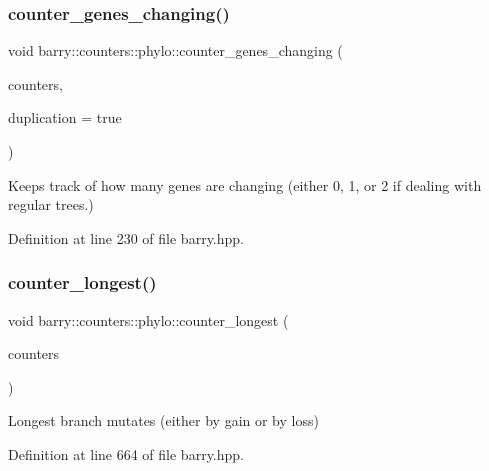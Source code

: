 \subsubsection{\texorpdfstring{counter\+\_\+genes\+\_\+changing()}{counter\_genes\_changing()}}
{\footnotesize\ttfamily void barry\+::counters\+::phylo\+::counter\+\_\+genes\+\_\+changing (\begin{DoxyParamCaption}\item[{\hyperlink{namespacebarry_1_1counters_1_1phylo_a4e401ffe66d04091343dcffaf915f8c3}{Phylo\+Counters} $\ast$}]{counters,  }\item[{bool}]{duplication = {\ttfamily true} }\end{DoxyParamCaption})\hspace{0.3cm}{\ttfamily [inline]}}



Keeps track of how many genes are changing (either 0, 1, or 2 if dealing with regular trees.) 



Definition at line 230 of file barry.\+hpp.

\mbox{\label{namespacebarry_1_1counters_1_1phylo_ae4ace7c30011a6d7047a94fd0ddf2df2}} 
\subsubsection{\texorpdfstring{counter\+\_\+longest()}{counter\_longest()}}
{\footnotesize\ttfamily void barry\+::counters\+::phylo\+::counter\+\_\+longest (\begin{DoxyParamCaption}\item[{\hyperlink{namespacebarry_1_1counters_1_1phylo_a4e401ffe66d04091343dcffaf915f8c3}{Phylo\+Counters} $\ast$}]{counters }\end{DoxyParamCaption})\hspace{0.3cm}{\ttfamily [inline]}}



Longest branch mutates (either by gain or by loss) 



Definition at line 664 of file barry.\+hpp.

\mbox{\label{namespacebarry_1_1counters_1_1phylo_affbd49d13928ece0a2f100261375d2a7}} 
